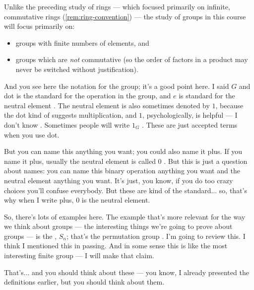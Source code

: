 \begin{content}
Unlike the preceding study of rings --- which focused primarily on infinite, commutative rings (\cref{rem:ring-convention}) --- the study of groups in this course will focus primarily on:
\begin{itemize}
    \item groups with finite numbers of elements, and
    \item groups which are \emph{not} commutative (so the order of factors in a product may never be switched without justification).
\end{itemize}

\end{content}

\begin{speech}[00:50:18 - 00:51:50]
And you see here the notation for the group; it's a good point here. I said $G$ and dot is the standard for the operation in the group, and $e$ is standard for the neutral element . The neutral element is also sometimes denoted by $1$, because the dot kind of suggests multiplication, and $1$, psychologically, is helpful --- I don't know . Sometimes people will write $1_G$ . These are just accepted terms when you use dot.

But you can name this anything you want; you could also name it plus. If you name it plus, usually the neutral element is called $0$ . But this is just a question about names: you can name this binary operation anything you want and the neutral element anything you want. It's just, you know, if you do too crazy choices you'll confuse everybody. But these are kind of the standard... so, that's why when I write plus, $0$ is the neutral element.

So, there's lots of examples here. The example that's more relevant for the way we think about groups --- the interesting things we're going to prove about groups --- is the , $S_n$; that's the permutation group . I'm going to review this. I think I mentioned this in passing. And in some sense this is like the most interesting finite group --- I will make that claim.

That's... and you should think about these --- you know, I already presented the definitions earlier, but you should think about them.
\end{speech}

